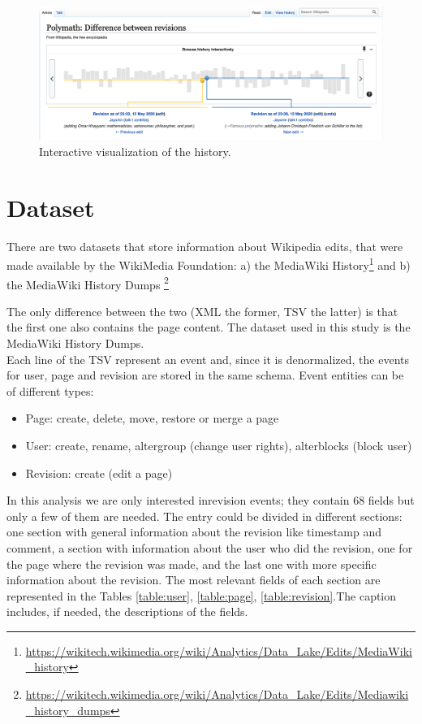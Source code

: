 \begin{figure}[H]
    \centering
    \includegraphics[width=1\textwidth]{./chapters/02/assets/history.png}
    \caption{Interactive visualization of the history.}
    \label{fig:history}
\end{figure}


\section{Dataset}
There are two datasets that store information about Wikipedia edits, that were made available by the WikiMedia
Foundation: a) the MediaWiki History\footnote{\url{https://wikitech.wikimedia.org/wiki/Analytics/Data_Lake/Edits/MediaWiki_history}} 
and b) the MediaWiki History Dumps \footnote{\url{https://wikitech.wikimedia.org/wiki/Analytics/Data_Lake/Edits/Mediawiki_history_dumps}}


The only difference between the two (XML the former, TSV the latter) is that the first one also
contains the page content. The dataset used in this study is the MediaWiki History Dumps.\\

Each line of the TSV represent an event and, since it is denormalized, the events for user, page and
revision are stored in the same schema.
Event entities can be of different types:
\begin{itemize}
    \item Page: create, delete, move, restore or merge a page
    \item User: create, rename, altergroup (change user rights), alterblocks (block user)
    \item Revision: create (edit a page)
\end{itemize}

In this analysis we are only interested inrevision events; they contain 68 fields but only a few of them are
needed. The entry could be divided in different sections: one section with general information about
the revision like timestamp and comment, a section with information about the user who did the
revision, one for the page where the revision was made, and the last one with more specific
information about the revision. The most relevant fields of each section are represented in the Tables 
\ref{table:user}, \ref{table:page}, \ref{table:revision}.The caption includes, if
needed, the descriptions of the fields.


